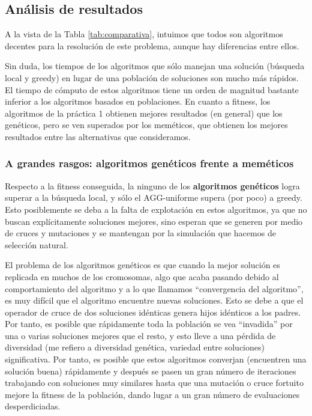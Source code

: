 \documentclass{article}
\begin{document}
\subsection{Análisis de resultados}

A la vista de la Tabla \ref{tab:comparativa}, intuimos que todos son algoritmos decentes para la resolución
de este problema, aunque hay diferencias entre ellos.

Sin duda, los tiempos de los algoritmos que sólo manejan una solución (búsqueda local y greedy) en lugar de
una población de soluciones son mucho más rápidos. El tiempo de cómputo de estos algoritmos tiene un orden
de magnitud bastante inferior a los algoritmos basados en poblaciones. En cuanto a fitness, los algoritmos de
la práctica 1 obtienen mejores resultados (en general) que los genéticos, pero se ven superados por los meméticos, que
obtienen los mejores resultados entre las alternativas que consideramos.

\subsubsection*{A grandes rasgos: algoritmos genéticos frente a meméticos}

Respecto a la fitness conseguida, la ninguno de los \textbf{algoritmos genéticos} logra superar a la búsqueda local, y sólo
el AGG-uniforme supera (por poco) a greedy. Esto posiblemente se deba a la falta de explotación en estos algoritmos, ya que
no buscan explícitamente soluciones mejores, sino esperan que se generen por medio de cruces y mutaciones y se
mantengan por la simulación que hacemos de selección natural.

El problema de los algoritmos genéticos es que cuando la mejor solución es replicada en muchos de los cromosomas,
algo que acaba pasando debido al comportamiento del algoritmo y a lo que llamamos ``convergencia del algoritmo'',
es muy difícil que el algoritmo encuentre nuevas soluciones. Esto se debe a que el operador de cruce de dos
soluciones idénticas genera hijos idénticos a los padres. Por tanto, es posible que rápidamente toda la población
se vea ``invadida'' por una o varias soluciones mejores que el resto, y esto lleve a una pérdida de diversidad
 (me refiero a diversidad genética, variedad entre soluciones) significativa. Por tanto, es posible que estos algoritmos
 converjan (encuentren una solución buena) rápidamente y después se pasen un gran número de iteraciones trabajando con
 soluciones muy similares hasta que una mutación o cruce fortuito mejore la fitness de la población, dando lugar
 a un gran número de evaluaciones desperdiciadas.
\end{document}
